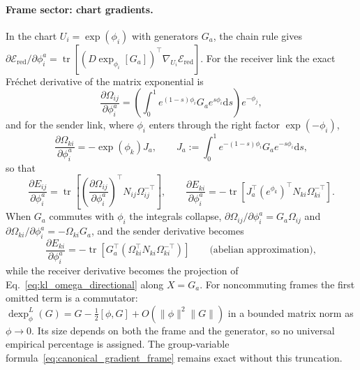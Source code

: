 \paragraph{Frame sector: chart gradients.}
In the chart $U_i = \exp(\phi_i)$ with generators $G_a$, the chain rule gives $\partial\mathcal{E}_{\mathrm{red}}/\partial\phi_i^a = \operatorname{tr}[(D\exp_{\phi_i}[G_a])^\top\nabla_{U_i}\mathcal{E}_{\mathrm{red}}]$. For the receiver link the exact Fr\'echet derivative of the matrix exponential is
\begin{equation}
\frac{\partial \Omega_{ij}}{\partial \phi_i^a} = \left(\int_0^1 e^{(1-s)\phi_i} G_a e^{s\phi_i} \mathrm{d}s\right) e^{-\phi_j},
\label{eq:frechet_dexp}
\end{equation}
and for the sender link, where $\phi_i$ enters through the right factor $\exp(-\phi_i)$,
\begin{equation}
\frac{\partial \Omega_{ki}}{\partial \phi_i^a} = -\exp(\phi_k)J_a,
\qquad
J_a := \int_0^1 e^{-(1-s)\phi_i} G_a e^{-s\phi_i} \mathrm{d}s,
\label{eq:frechet_dexp_sender}
\end{equation}
so that
\begin{equation}
\frac{\partial E_{ij}}{\partial \phi_i^a} = \operatorname{tr}\left[\left(\frac{\partial \Omega_{ij}}{\partial \phi_i^a}\right)^\top N_{ij}\Omega_{ij}^{-\top}\right],
\qquad
\frac{\partial E_{ki}}{\partial \phi_i^a} = -\operatorname{tr}\left[J_a^\top (e^{\phi_k})^\top N_{ki}\Omega_{ki}^{-\top}\right].
\end{equation}
When $G_a$ commutes with $\phi_i$ the integrals collapse, $\partial \Omega_{ij}/\partial \phi_i^a = G_a \Omega_{ij}$ and $\partial \Omega_{ki}/\partial \phi_i^a = -\Omega_{ki} G_a$, and the sender derivative becomes
\begin{equation}
\frac{\partial E_{ki}}{\partial \phi_i^a} = -\operatorname{tr}\left[G_a^\top\left(\Omega_{ki}^\top N_{ki} \Omega_{ki}^{-\top}\right)\right] \qquad \text{(abelian approximation)},
\label{eq:sender_phi_gradient}
\end{equation}
while the receiver derivative becomes the projection of Eq.~\eqref{eq:kl_omega_directional} along $X = G_a$. For noncommuting frames the first omitted term is a commutator: $\operatorname{dexp}_{\phi}^{L}(G)=G-\tfrac12[\phi,G]+O(\|\phi\|^2\|G\|)$ in a bounded matrix norm as $\phi\to0$. Its size depends on both the frame and the generator, so no universal empirical percentage is assigned. The group-variable formula~\eqref{eq:canonical_gradient_frame} remains exact without this truncation.

